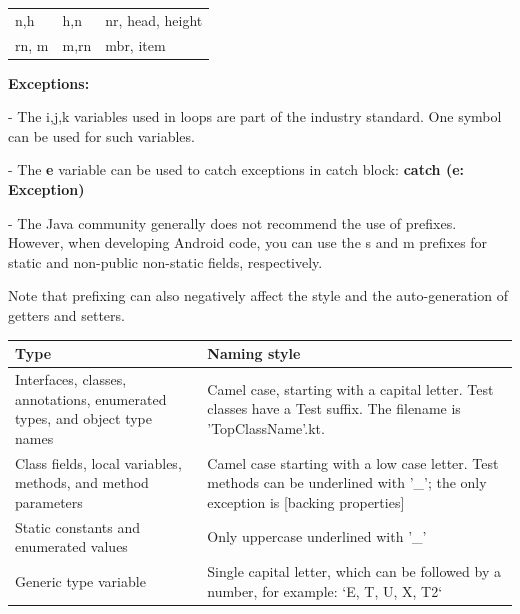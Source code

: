 {{{{{{{{{{{{{{{{\begin{center}
\begin{tabular}{ |p{5.0cm}|p{5.0cm}|p{5.0cm}| }
 n,h           & h,n                      & nr, head, height \\

 rn, m         & m,rn                     & mbr, item        \\

\hline

\end{tabular}

\end{center}

\textbf{Exceptions:}

- The i,j,k variables used in loops are part of the industry standard. One symbol can be used for such variables.

- The \textbf{e} variable can be used to catch exceptions in catch block: \textbf{catch (e: Exception) {}}

- The Java community generally does not recommend the use of prefixes. However, when developing Android code, you can use the s and m prefixes for static and non-public non-static fields, respectively.

Note that prefixing can also negatively affect the style and the auto-generation of getters and setters.



\begin{center}

\begin{tabular}{ |p{7.5cm}|p{7.5cm}| }

\hline

Type&Naming style\\

\hline

 Interfaces, classes, annotations, enumerated types, and object type names & Camel case, starting with a capital letter. Test classes have a Test suffix. The filename is 'TopClassName'.kt.  \\

 Class fields, local variables, methods, and method parameters & Camel case starting with a low case letter. Test methods can be underlined with '\_'; the only exception is [backing properties]\\

 Static constants and enumerated values & Only uppercase underlined with '\_' \\

 Generic type variable & Single capital letter, which can be followed by a number, for example: `E, T, U, X, T2` \\


\end{tabular}
\end{center}}}}}}}}}}}}}}}}}
